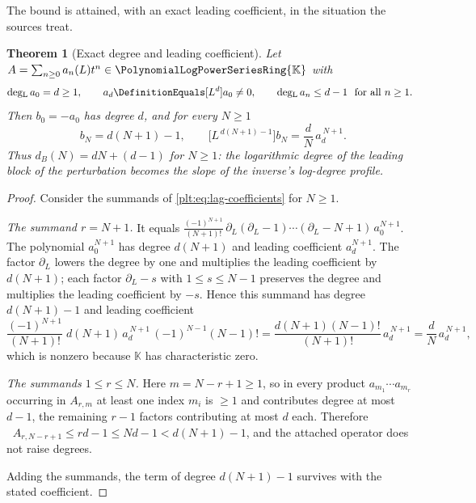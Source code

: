 \documentclass[11pt,oneside]{article}
\theoremstyle{plain}
\newtheorem{theorem}{Theorem}[section]
\theoremstyle{definition}
\theoremstyle{remark}
\newcommand{\K}{\mathbb{K}}
\newcommand{\PLpow}{\PolynomialLogPowerSeriesRing{\K}}   %
\DeclareMathOperator{\degL}{deg_{L}}
\newcommand{\dprofile}[1]{d_{#1}}                        %
\begin{document}
The bound is attained, with an exact leading coefficient, in the situation the
sources treat.

\begin{theorem}[Exact degree and leading coefficient]
\label{plt:thm:lag-degree-sharp}
Let \(A=\sum_{n\ge0}a_n(L)t^n\in\PLpow\) with
\[
  \degL a_0=d\ge1,
  \qquad
  a_d\DefinitionEquals[L^d]a_0\ne0,
  \qquad
  \degL a_n\le d-1\ \text{ for all }n\ge1 .
\]
Then \(b_0=-a_0\) has degree \(d\), and for every \(N\ge1\)
\begin{equation}
\label{plt:eq:lag-degree-sharp}
  \degL b_N=d(N+1)-1,
  \qquad
  \bigl[L^{\,d(N+1)-1}\bigr]b_N=\frac{d}{N}\,a_d^{\,N+1}.
\end{equation}
Thus \(\dprofile{B}(N)=dN+(d-1)\) for \(N\ge1\): the logarithmic degree of the
leading block of the perturbation becomes the \emph{slope} of the inverse's
log-degree profile.
\end{theorem}

\begin{proof}
Consider the summands of \cref{plt:eq:lag-coefficients} for \(N\ge1\).

\emph{The summand \(r=N+1\).}  It equals
\(\frac{(-1)^{N+1}}{(N+1)!}\,\partial_L(\partial_L-1)\cdots(\partial_L-N+1)\,a_0^{N+1}\).
The polynomial \(a_0^{N+1}\) has degree \(d(N+1)\) and leading coefficient
\(a_d^{N+1}\).  The factor \(\partial_L\) lowers the degree by one and multiplies
the leading coefficient by \(d(N+1)\); each factor \(\partial_L-s\) with
\(1\le s\le N-1\) preserves the degree and multiplies the leading coefficient
by \(-s\).  Hence this summand has degree \(d(N+1)-1\) and leading coefficient
\[
  \frac{(-1)^{N+1}}{(N+1)!}\;d(N+1)\,a_d^{\,N+1}\,(-1)^{N-1}(N-1)!
  =\frac{d(N+1)(N-1)!}{(N+1)!}\,a_d^{\,N+1}
  =\frac{d}{N}\,a_d^{\,N+1},
\]
which is nonzero because \(\K\) has characteristic zero.

\emph{The summands \(1\le r\le N\).}  Here \(m=N-r+1\ge1\), so in every product
\(a_{m_1}\cdots a_{m_r}\) occurring in \(A_{r,m}\) at least one index
\(m_i\) is \(\ge1\) and contributes degree at most \(d-1\), the remaining
\(r-1\) factors contributing at most \(d\) each.  Therefore
\(\degL A_{r,N-r+1}\le rd-1\le Nd-1<d(N+1)-1\), and the attached operator does
not raise degrees.

Adding the summands, the term of degree \(d(N+1)-1\) survives with the stated
coefficient.
\end{proof}
\end{document}
